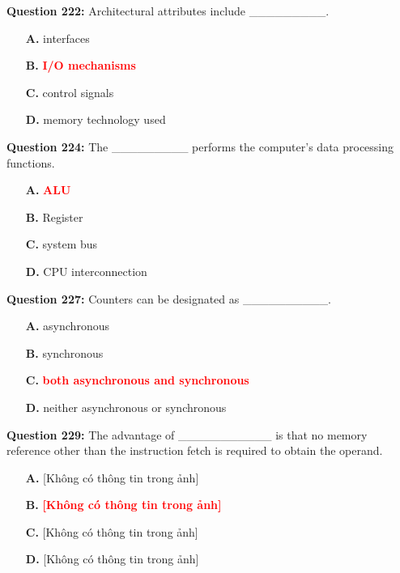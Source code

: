 \documentclass[12pt,a4paper]{article}
\begin{document}
\vspace{0.5cm}

\textbf{Question 222:} Architectural attributes include _________.

\begin{itemize}
    \item[\textbf{A.}] interfaces
    \item[\textbf{B.}] \textcolor{red}{\textbf{I/O mechanisms}}
    \item[\textbf{C.}] control signals
    \item[\textbf{D.}] memory technology used
\end{itemize}

\vspace{0.5cm}

\textbf{Question 224:} The _________ performs the computer's data processing functions.

\begin{itemize}
    \item[\textbf{A.}] \textcolor{red}{\textbf{ALU}}
    \item[\textbf{B.}] Register
    \item[\textbf{C.}] system bus
    \item[\textbf{D.}] CPU interconnection
\end{itemize}

\vspace{0.5cm}

\textbf{Question 227:} Counters can be designated as __________.

\begin{itemize}
    \item[\textbf{A.}] asynchronous
    \item[\textbf{B.}] synchronous
    \item[\textbf{C.}] \textcolor{red}{\textbf{both asynchronous and synchronous}}
    \item[\textbf{D.}] neither asynchronous or synchronous
\end{itemize}

\vspace{0.5cm}

\textbf{Question 229:} The advantage of ___________ is that no memory reference other than the instruction fetch is required to obtain the operand.

\begin{itemize}
    \item[\textbf{A.}] [Không có thông tin trong ảnh]
    \item[\textbf{B.}] \textcolor{red}{\textbf{[Không có thông tin trong ảnh]}}
    \item[\textbf{C.}] [Không có thông tin trong ảnh]
    \item[\textbf{D.}] [Không có thông tin trong ảnh]
\end{itemize}
\end{document}
